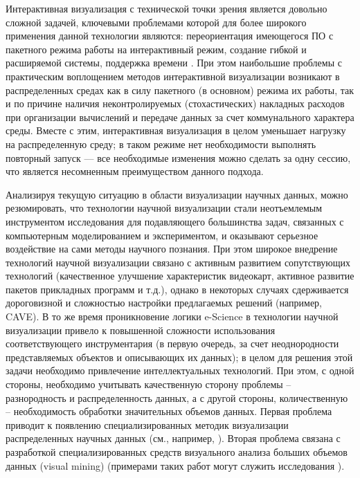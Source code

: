 Интерактивная визуализация с технической точки зрения является довольно сложной задачей, ключевыми проблемами которой для более широкого применения данной технологии являются: переориентация имеющегося ПО с пакетного режима работы на интерактивный режим, создание гибкой и расширяемой системы, поддержка  времени \citep{dk68}. При этом наибольшие проблемы с практическим воплощением методов интерактивной визуализации возникают в распределенных средах как в силу пакетного (в основном) режима их работы, так и по причине наличия неконтролируемых (стохастических) накладных расходов при организации вычислений и передаче данных за счет коммунального характера среды. Вместе с этим, интерактивная визуализация в целом уменьшает нагрузку на распределенную среду; в таком режиме нет необходимости выполнять повторный запуск --– все необходимые изменения можно сделать за одну сессию, что является несомненным преимуществом данного подхода.

Анализируя текущую ситуацию в области визуализации научных данных, можно резюмировать, что технологии научной визуализации стали неотъемлемым инструментом исследования для подавляющего большинства задач, связанных с компьютерным моделированием и экспериментом, и оказывают серьезное воздействие на сами методы научного познания. При этом широкое внедрение технологий научной визуализации связано с активным развитием сопутствующих технологий (качественное улучшение характеристик видеокарт, активное развитие пакетов прикладных программ и т.д.), однако в некоторых случаях сдерживается дороговизной и сложностью настройки предлагаемых решений (например, CAVE). В то же время проникновение логики e-Science в технологии научной визуализации привело к повышенной сложности использования соответствующего инструментария (в первую очередь, за счет неоднородности представляемых объектов и описывающих их данных); в целом для решения этой задачи необходимо привлечение интеллектуальных технологий. При этом, с одной стороны, необходимо учитывать качественную сторону проблемы – разнородность и распределенность данных, а с другой стороны, количественную – необходимость обработки значительных объемов данных. Первая проблема приводит к появлению специализированных методик визуализации распределенных научных данных (см., например, \citep{dk69}\citep{dk70}). Вторая проблема связана с разработкой специализированных средств визуального анализа больших объемов данных (visual mining) (примерами таких работ могут служить исследования \citep{dk71}\citep{dk72}). 


